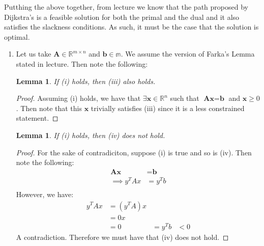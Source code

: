 \documentclass[12pt]{exam}
\newtheorem{lemma}[theorem]{Lemma}
\newcommand{\Q}[1]{\question{\large{\textbf{#1}}}}
\begin{document}
\begin{questions}
\begin{solution}
\begin{enumerate}[label=(\alph*)]
    Putthing the above together, from lecture we know that the path proposed by Dijkstra's is a feasible solution for both the primal and the dual and it also satisfies the slackness conditions. As such, it must be the case that the solution is optimal.
  \end{enumerate}
\end{solution}

\newpage
\Q{Problem 8}
\begin{solution}
  \begin{enumerate}[label=(\alph*)]
    \item
      Let us take $\textbf{A} \in \mathbb{R}^{m \times n}$ and $\textbf{b} \in \mathbb{m}$. We assume the version of Farka's Lemma stated in lecture. Then note the following:
      \begin{lemma}
        If (i) holds, then (iii) also holds.
      \end{lemma}
      \begin{proof}
        Assuming (i) holds, we have that $\exists \textbf{x} \in \mathbb{R}^n$ such that $\textbf{Ax} = \textbf{b}$ and $\textbf{x} \geq 0$. Then note that this $\textbf{x}$ trivially satisfies (iii) since it is a less constrained statement.
      \end{proof}

      \begin{lemma}
        If (i) holds, then (iv) does not hold.
      \end{lemma}
      \begin{proof}
        For the sake of contradiciton, suppose (i) is true and so is (iv). Then note the following:
        \begin{align*}
          \textbf{Ax} &= \textbf{b} \tag{By (i)} \\
          \implies y^TAx &= y^Tb \tag{Muliply by through $y^T$ using $y$ from (iv)} \\
        \end{align*}
        However, we have:
        \begin{align*}
          y^TAx &= (y^TA)x \\
          &= 0x \tag{By (iv)} \\
          &= 0
          & = y^Tb
          &< 0 \tag{By (iv)}
        \end{align*}
        A contradiction. Therefore we must have that (iv) does not hold.
      \end{proof}


\end{enumerate}
\end{solution}
\end{questions}
\end{document}
